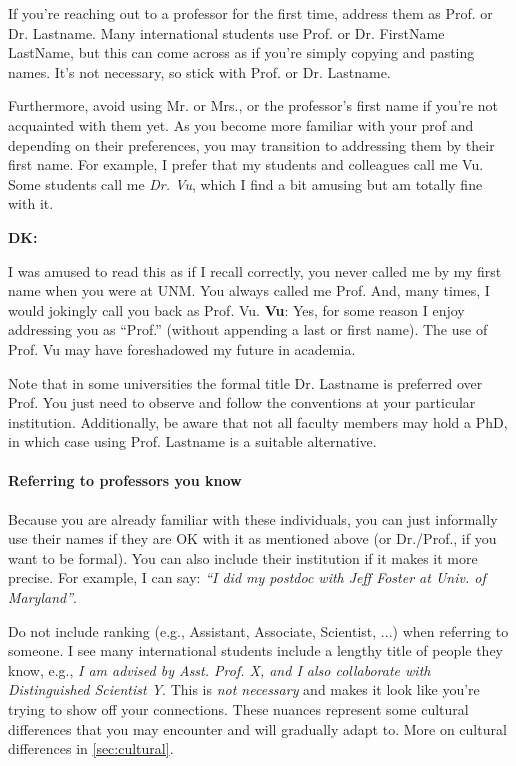 \documentclass[oneside,11pt,dvipsnames]{book}
\newenvironment{commentbox}[1][]{
  \small
  \begin{mybox}
    {\small \textbf{#1}}
  }{
  \end{mybox}
}
\begin{document}
If you're reaching out to a professor for the first time,  address them as Prof. or Dr. Lastname. Many international students use Prof. or Dr. FirstName LastName, but this can come across as if you're simply copying and pasting names. It's not necessary, so stick with Prof. or Dr. Lastname.


Furthermore, avoid using Mr. or Mrs., or the professor's first name if you're not acquainted with them yet.  As you become more familiar with your prof and depending on their preferences, you may transition to addressing them by their first name.
For example, I prefer that my students and colleagues call me Vu. Some students call me \emph{Dr. Vu}, which I find a bit amusing but am totally fine with it.

\begin{commentbox}[DK:]
  I was amused to read this as if I recall correctly, you never called me by my first name when you were at UNM. You always called me Prof. And, many times, I would jokingly call you back as Prof. Vu.
  \tcblower
  \textbf{Vu}: Yes, for some reason I enjoy addressing you as ``Prof.'' (without appending a last or first name).  The use of Prof. Vu may have foreshadowed my future in academia.
\end{commentbox}

Note that in some universities the formal title Dr. Lastname is preferred over Prof. You just need to observe and follow the conventions at your particular institution. Additionally, be aware that not all faculty members may hold a PhD, in which case using Prof. Lastname is a suitable alternative.


\paragraph{Referring to professors you know} Because you are already familiar with these individuals, you can just informally use their names if they are OK with it as mentioned above (or Dr./Prof., if you want to be formal). You can also include their institution if it makes it more precise.  For example, I can say:  \emph{``I did my postdoc with Jeff Foster at Univ. of Maryland''}.

Do not include ranking (e.g., Assistant, Associate, Scientist, ...) when referring to someone. I see many international students include a lengthy title of people they know, e.g., \emph{I am advised by Asst. Prof. X, and I also collaborate with Distinguished Scientist Y}.  This is \emph{not necessary} and makes it look like you're trying to show off your connections. These nuances represent some cultural differences that you may encounter and will gradually adapt to. More on cultural differences in \autoref{sec:cultural}.
\end{document}
